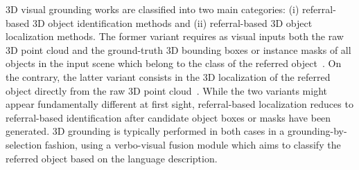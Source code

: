 \documentclass[10pt,twocolumn,letterpaper]{article}
\begin{document}
3D visual grounding works are classified into two main categories: (i) referral-based 3D object identification methods and (ii) referral-based 3D object localization methods. The former variant requires as visual inputs both the raw 3D point cloud and the ground-truth 3D bounding boxes or instance masks of all objects in the input scene which belong to the class of the referred object~\cite{achlioptas2020referit_3d}. On the contrary, the latter variant consists in the 3D localization of the referred object directly from the raw 3D point cloud~\cite{chen2020scanrefer}.
While the two variants might appear fundamentally different at first sight, referral-based localization reduces to referral-based identification after candidate object boxes or masks have been generated. 
3D grounding is typically performed in both cases in a grounding-by-selection fashion, using a verbo-visual fusion module which aims to classify the referred object based on the language description.
\end{document}
